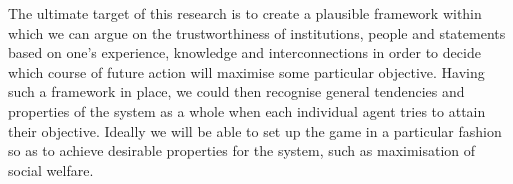   The ultimate target of this research is to create a plausible framework within which we
  can argue on the trustworthiness of institutions, people and statements based on one's
  experience, knowledge and interconnections in order to decide which course of future
  action will maximise some particular objective. Having such a framework in place, we
  could then recognise general tendencies and properties of the system as a whole when
  each individual agent tries to attain their objective. Ideally we will be able to set up
  the game in a particular fashion so as to achieve desirable properties for the system,
  such as maximisation of social welfare.
